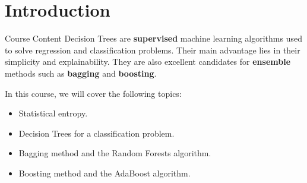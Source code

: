 \section[Introduction]{Introduction}

\begin{frame}{Course Content}
	Decision Trees are \textbf{supervised} machine learning algorithms used to solve regression and classification problems. Their main advantage lies in their simplicity and explainability. They are also excellent candidates for \textbf{ensemble} methods such as \textbf{bagging} and \textbf{boosting}.
	
	\vspace{0.5cm}
	
	In this course, we will cover the following topics:
	\begin{itemize}
		\pause
		\item Statistical entropy.
		\pause
		\item Decision Trees for a classification problem.
		\pause
		\item Bagging method and the Random Forests algorithm.
		\pause
		\item Boosting method and the AdaBoost algorithm.
	\end{itemize}
\end{frame}